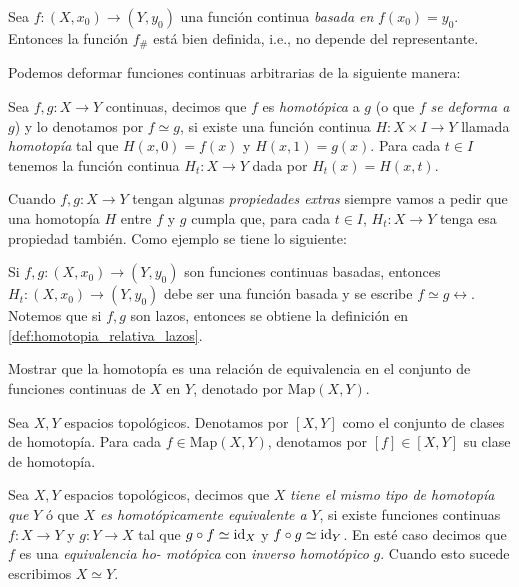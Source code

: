     \begin{prop}
    \label{prop:bien_def_funtor_fundamental}
        Sea $f:(X,x_0)\to(Y,y_0)$ una función continua \textit{basada en} $f(x_0)=y_0$. Entonces la función $f_\#$ está bien definida, i.e., no depende del representante.
    \end{prop}
    \begin{dem}
        
    \end{dem}
    Podemos deformar funciones continuas arbitrarias de la siguiente manera:
    \begin{definicion}
        Sea $f,g:X\to Y$ continuas, decimos que $f$ es \textit{homotópica} a $g$ (o que $f$ \textit{se deforma a} $g$) y lo denotamos por $f\simeq g$, si existe una función continua $H:X\times I\to Y$ llamada \textit{homotopía} tal que $H(x,0)=f(x)$ y $H(x,1)=g(x)$. Para cada $t\in I$ tenemos la función continua $H_t:X\to Y$ dada por $H_t(x)=H(x,t)$.
    \end{definicion}
    \begin{nota}
        Cuando $f,g:X\to Y$ tengan algunas \textit{propiedades extras} siempre vamos a pedir que una homotopía $H$ entre $f$ y $g$ cumpla que, para cada $t\in I$, $H_t:X\to Y$ tenga esa propiedad también. Como ejemplo se tiene lo siguiente:
        
        Si $f,g:(X,x_0)\to (Y,y_0)$ son funciones continuas basadas, entonces $H_t:(X,x_0)\to(Y,y_0)$ debe ser una función basada y se escribe $f\simeq g\rel$. Notemos que si $f,g$ son lazos, entonces se obtiene la definición en \ref{def:homotopia_relativa_lazos}.
    \end{nota}
    \begin{ejercicio}
        Mostrar que la homotopía es una relación de equivalencia en el conjunto de funciones continuas de $X$ en $Y$, denotado por $\text{Map}(X,Y)$.
    \end{ejercicio}
    \begin{definicion}
        Sea $X,Y$ espacios topológicos. Denotamos por $[X,Y]$ como el conjunto de clases de homotopía. Para cada $f\in \text{Map}(X,Y)$, denotamos por $[f]\in [X,Y]$ su clase de homotopía.
    \end{definicion}
    \begin{definicion}
        Sea $X,Y$ espacios topológicos, decimos que $X$ \textit{tiene el mismo tipo de homotopía que} $Y$ ó que $X$ \textit{es homotópicamente equivalente a} $Y$, si existe funciones continuas $f:X\to Y$ y $g:Y\to X$ tal que $g\circ f\simeq \mathrm{id}_X$ y $f\circ g\simeq \mathrm{id}_Y$. En esté caso decimos que $f$ es una \textit{equivalencia ho- motópica} con \textit{inverso homotópico} $g$. Cuando esto sucede escribimos $X\simeq Y.$
    \end{definicion}
